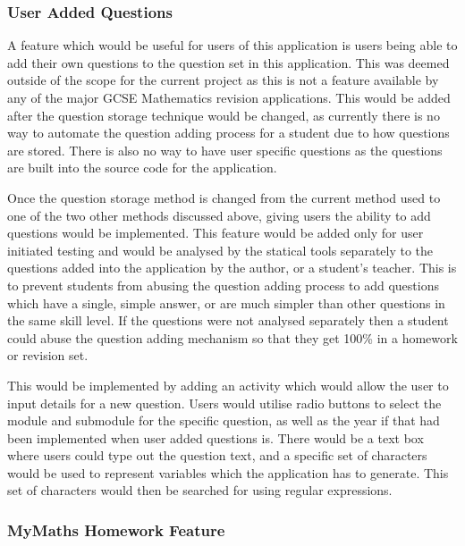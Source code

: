 \documentclass{article}
\begin{document}
\subsubsection{User Added Questions}

A feature which would be useful for users of this application is users being able to add their own questions to the question set in this application. This was deemed outside of the scope for the current project as this is not a feature available by any of the major GCSE Mathematics revision applications. This would be added after the question storage technique would be changed, as currently there is no way to automate the question adding process for a student due to how questions are stored. There is also no way to have user specific questions as the questions are built into the source code for the application. \par

Once the question storage method is changed from the current method used to one of the two other methods discussed above, giving users the ability to add questions would be implemented. This feature would be added only for user initiated testing and would be analysed by the statical tools separately to the questions added into the application by the author, or a student's teacher. This is to prevent students from abusing the question adding process to add questions which have a single, simple answer, or are much simpler than other questions in the same skill level. If the questions were not analysed separately then a student could abuse the question adding mechanism so that they get 100\% in a homework or revision set. \par

This would be implemented by adding an activity which would allow the user to input details for a new question. Users would utilise radio buttons to select the module and submodule for the specific question, as well as the year if that had been implemented when user added questions is. There would be a text box where users could type out the question text, and a specific set of characters would be used to represent variables which the application has to generate. This set of characters would then be searched for using regular expressions. \par

\subsubsection{MyMaths Homework Feature}
\end{document}
